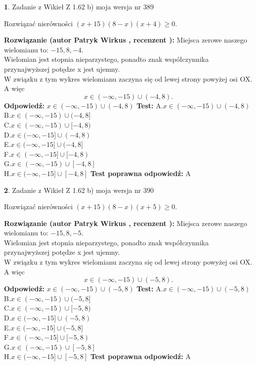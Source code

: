 \documentclass[12pt, a4paper]{article}
\theoremstyle{definition} %
\newtheorem{zad}{}
\newcommand{\zadStart}[1]{\begin{zad}#1\newline}
\newcommand{\zadStop}{\end{zad}}
\newcommand{\rozwStart}[2]{\noindent \textbf{Rozwiązanie (autor #1 , recenzent #2): }\newline}
\newcommand{\rozwStop}{\newline}
\newcommand{\odpStart}{\noindent \textbf{Odpowiedź:}\newline}
\newcommand{\odpStop}{\newline}
\newcommand{\testStart}{\noindent \textbf{Test:}\newline}
\newcommand{\testStop}{\newline}
\newcommand{\kluczStart}{\noindent \textbf{Test poprawna odpowiedź:}\newline}
\newcommand{\kluczStop}{\newline}
\begin{document}
\zadStart{Zadanie z Wikieł Z 1.62 b) moja wersja nr 389}

Rozwiązać nierówności $(x+15)(8-x)(x+4)\ge0$.
\zadStop
\rozwStart{Patryk Wirkus}{}
Miejsca zerowe naszego wielomianu to: $-15, 8, -4$.\\
Wielomian jest stopnia nieparzystego, ponadto znak współczynnika przy\linebreak najwyższej potędze x jest ujemny.\\ W związku z tym wykres wielomianu zaczyna się od lewej strony powyżej osi OX. A więc $$x \in (-\infty,-15) \cup (-4,8).$$
\rozwStop
\odpStart
$x \in (-\infty,-15) \cup (-4,8)$
\odpStop
\testStart
A.$x \in (-\infty,-15) \cup (-4,8)$\\
B.$x \in (-\infty,-15) \cup (-4,8]$\\
C.$x \in (-\infty,-15) \cup [-4,8)$\\
D.$x \in (-\infty,-15] \cup (-4,8)$\\
E.$x \in (-\infty,-15] \cup (-4,8]$\\
F.$x \in (-\infty,-15] \cup [-4,8)$\\
G.$x \in (-\infty,-15) \cup [-4,8]$\\
H.$x \in (-\infty,-15] \cup [-4,8]$
\testStop
\kluczStart
A
\kluczStop



\zadStart{Zadanie z Wikieł Z 1.62 b) moja wersja nr 390}

Rozwiązać nierówności $(x+15)(8-x)(x+5)\ge0$.
\zadStop
\rozwStart{Patryk Wirkus}{}
Miejsca zerowe naszego wielomianu to: $-15, 8, -5$.\\
Wielomian jest stopnia nieparzystego, ponadto znak współczynnika przy\linebreak najwyższej potędze x jest ujemny.\\ W związku z tym wykres wielomianu zaczyna się od lewej strony powyżej osi OX. A więc $$x \in (-\infty,-15) \cup (-5,8).$$
\rozwStop
\odpStart
$x \in (-\infty,-15) \cup (-5,8)$
\odpStop
\testStart
A.$x \in (-\infty,-15) \cup (-5,8)$\\
B.$x \in (-\infty,-15) \cup (-5,8]$\\
C.$x \in (-\infty,-15) \cup [-5,8)$\\
D.$x \in (-\infty,-15] \cup (-5,8)$\\
E.$x \in (-\infty,-15] \cup (-5,8]$\\
F.$x \in (-\infty,-15] \cup [-5,8)$\\
G.$x \in (-\infty,-15) \cup [-5,8]$\\
H.$x \in (-\infty,-15] \cup [-5,8]$
\testStop
\kluczStart
A
\kluczStop
\end{document}
